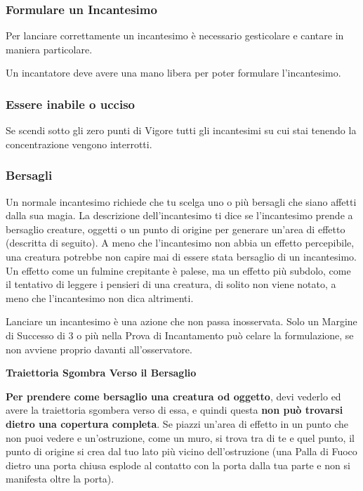 \documentclass[12pt,a4paper,twoside,openany]{book}
\begin{document}
\begin{multicols}{2}
\begin{itemize}
\end{itemize}

\subsubsection{Formulare un Incantesimo}

Per lanciare correttamente un incantesimo è necessario gesticolare e cantare in maniera particolare.

Un incantatore deve avere una mano libera per poter formulare l'incantesimo.

\subsubsection{Essere inabile o ucciso}\label{magieessereucciso}

Se scendi sotto gli zero punti di Vigore tutti gli incantesimi su cui stai tenendo la concentrazione vengono interrotti.

\subsubsection{Bersagli}\label{magiebersagli}

Un normale incantesimo richiede che tu scelga uno o più bersagli che siano affetti dalla sua magia. La descrizione dell'incantesimo ti dice se l'incantesimo prende a bersaglio creature, oggetti o un punto di origine per generare un'area di effetto (descritta di seguito). A meno che l'incantesimo non abbia un effetto percepibile, una creatura potrebbe non capire mai di essere stata bersaglio di un incantesimo. Un effetto come un fulmine crepitante è palese, ma un effetto più subdolo, come il tentativo di leggere i pensieri di una creatura, di solito non viene notato, a meno che l'incantesimo non dica altrimenti.

Lanciare un incantesimo è una azione che non passa inosservata. Solo un Margine di Successo di 3 o più nella Prova di Incantamento può celare la formulazione, se non avviene proprio davanti all'osservatore.

\textbf{Traiettoria Sgombra Verso il Bersaglio}

\textbf{Per prendere come bersaglio una creatura od oggetto}, devi vederlo ed avere la traiettoria sgombera verso di essa, e quindi questa \textbf{non può trovarsi dietro una copertura completa}. Se piazzi un'area di effetto in un punto che non puoi vedere e un'ostruzione, come un muro, si trova tra di te e quel punto, il punto di origine si crea dal tuo lato più vicino dell'ostruzione (una Palla di Fuoco dietro una porta chiusa esplode al contatto con la porta dalla tua parte e non si manifesta oltre la porta).


\end{multicols}
\end{document}
